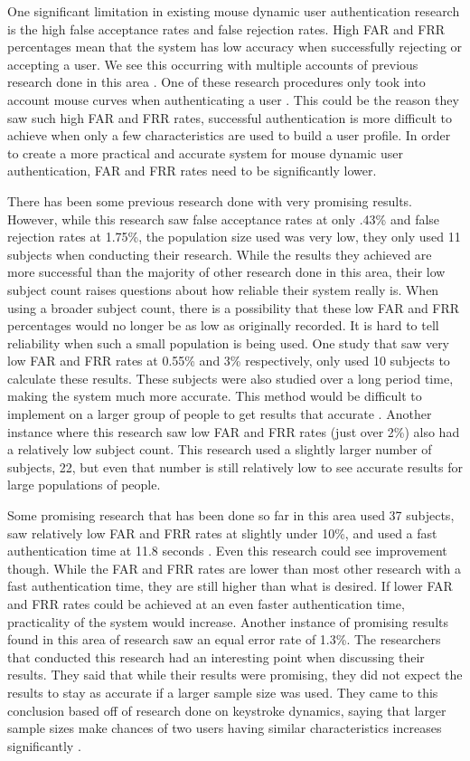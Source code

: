 \documentclass[conference]{IEEEtran}
\begin{document}
One significant limitation in existing mouse dynamic user authentication research is the high false acceptance rates and false rejection rates. High FAR and FRR percentages mean that the system has low accuracy when successfully rejecting or accepting a user. We see this occurring with multiple accounts of previous research done in this area \cite{Jor, CS, Sch}. One of these research procedures only took into account mouse curves when authenticating a user \cite{Sch}. This could be the reason they saw such high FAR and FRR rates, successful authentication is more difficult to achieve when only a few characteristics are used to build a user profile. In order to create a more practical and accurate system for mouse dynamic user authentication, FAR and FRR rates need to be significantly lower.

There has been some previous research done with very promising results. However, while this research saw false acceptance rates at only .43\% and false rejection rates at 1.75\%, the population size used was very low, they only used 11 subjects when conducting their research. While the results they achieved are more successful than the majority of other research done in this area, their low subject count raises questions about how reliable their system really is. When using a broader subject count, there is a possibility that these low FAR and FRR percentages would no longer be as low as originally recorded. It is hard to tell reliability when such a small population is being used. \cite{Pus} One study that saw very low FAR and FRR rates at 0.55\% and 3\% respectively, only used 10 subjects to calculate these results. These subjects were also studied over a long period time, making the system much more accurate. This method would be difficult to implement on a larger group of people to get results that accurate \cite{She}. Another instance where this research saw low FAR and FRR rates (just over 2\%) also had a relatively low subject count. This research used a slightly larger number of subjects, 22, but even that number is still relatively low to see accurate results for large populations of people. \cite{Ahmed}

Some promising research that has been done so far in this area used 37 subjects, saw relatively low FAR and FRR rates at slightly under 10\%, and used a fast authentication time at 11.8 seconds \cite{CS}. Even this research could see improvement though. While the FAR and FRR rates are lower than most other research with a fast authentication time, they are still higher than what is desired. If lower FAR and FRR rates could be achieved at an even faster authentication time, practicality of the system would increase. Another instance of promising results found in this area of research saw an equal error rate of 1.3\%. The researchers that conducted this research had an interesting point when discussing their results. They said that while their results were promising, they did not expect the results to stay as accurate if a larger sample size was used. They came to this conclusion based off of research done on keystroke dynamics, saying that larger sample sizes make chances of two users having similar characteristics increases significantly \cite{Zhe}.
\end{document}

